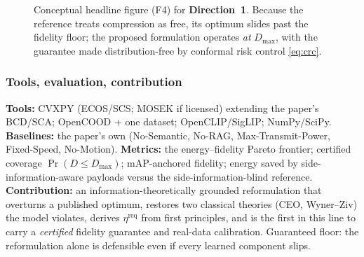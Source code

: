 \documentclass[11pt,a4paper]{article}
\newcommand{\Dir}[1]{\textcolor{accent}{\textbf{Direction~#1}}}
\begin{document}
\begin{figure}[t]
\centering
{}
\caption{Conceptual headline figure (F4) for \Dir{1}. Because the reference treats compression as free, its optimum slides past the fidelity floor; the proposed formulation operates \emph{at} $D_{\max}$, with the guarantee made distribution-free by conformal risk control \eqref{eq:crc}.}
\label{fig:pareto}
\end{figure}

\subsubsection{Tools, evaluation, contribution}
\textbf{Tools:} CVXPY (ECOS/SCS; MOSEK if licensed) extending the paper's BCD/SCA; OpenCOOD + one dataset; OpenCLIP/SigLIP; NumPy/SciPy. \textbf{Baselines:} the paper's own (No-Semantic, No-RAG, Max-Transmit-Power, Fixed-Speed, No-Motion). \textbf{Metrics:} the energy--fidelity Pareto frontier; certified coverage $\Pr(D\le D_{\max})$; mAP-anchored fidelity; energy saved by side-information-aware payloads versus the side-information-blind reference. \textbf{Contribution:} an information-theoretically grounded reformulation that overturns a published optimum, restores two classical theories (CEO, Wyner--Ziv) the model violates, derives $\eta^{\mathrm{req}}$ from first principles, and is the first in this line to carry a \emph{certified} fidelity guarantee and real-data calibration. Guaranteed floor: the reformulation alone is defensible even if every learned component slips.
\end{document}
